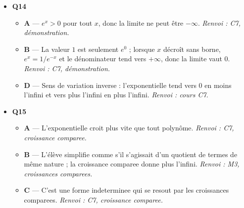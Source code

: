 \begin{itemize}
\begin{itemize}
  \end{itemize}
  \item \textbf{Q14}
  \begin{itemize}
    \item \textbf{A} — $e^x > 0$ pour tout $x$, donc la limite ne peut être $-\infty$. \emph{Renvoi : C7, démonstration.}
    \item \textbf{B} — La valeur $1$ est seulement $e^0$ ; lorsque $x$ décroît sans borne, $e^x=1/e^{-x}$ et le dénominateur tend vers $+\infty$, donc la limite vaut $0$. \emph{Renvoi : C7, démonstration.}
    \item \textbf{D} — Sens de variation inverse : l'exponentielle tend vers 0 en moins l'infini et vers plus l'infini en plus l'infini. \emph{Renvoi : cours C7.}
  \end{itemize}
  \item \textbf{Q15}
  \begin{itemize}
    \item \textbf{A} — L'exponentielle croit plus vite que tout polynôme. \emph{Renvoi : C7, croissance comparee.}
    \item \textbf{B} — L'élève simplifie comme s'il s'agissait d'un quotient de termes de même nature ; la croissance comparee donne plus l'infini. \emph{Renvoi : M3, croissances comparees.}
    \item \textbf{C} — C'est une forme indeterminee qui se resout par les croissances comparees. \emph{Renvoi : C7, croissance comparee.}
  \end{itemize}
\end{itemize}
\fi
